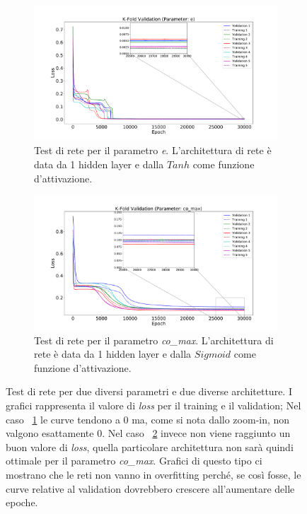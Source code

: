 \documentclass[12pt,a4paper,final]{book}
\begin{document}
\begin{figure}[!ht]
\centering
	\begin{subfigure}{\textwidth}
	    \centering
	    \includegraphics[width=0.77\linewidth]{../figures/validation_e_zoom.pdf}
	    \caption{Test di rete per il parametro \textit{e}. L'architettura di rete è data da 1 hidden layer e dalla $Tanh$ come funzione d'attivazione.}
	    \label{test1}
	\end{subfigure}
	\newline
	\begin{subfigure}{\textwidth}
		\centering
	    \includegraphics[width=0.77\linewidth]{../figures/validation_co_max_zoom.pdf}
		\caption{Test di rete per il parametro \textit{co\_max}. L'architettura di rete è data da 1 hidden layer e dalla $Sigmoid$ come funzione d'attivazione.}
		\label{test2}
	\end{subfigure}
	\caption{Test di rete per due diversi parametri e due diverse architetture. I grafici rappresenta il valore di \textit{loss} per il training e il validation; Nel caso ~\ref{test1} le curve tendono a 0 ma, come si nota dallo zoom-in, non valgono esattamente 0. Nel caso ~\ref{test2} invece non viene raggiunto un buon valore di \textit{loss}, quella particolare architettura non sarà quindi ottimale per il parametro \textit{co\_max}. Grafici di questo tipo ci mostrano che le reti non vanno in overfitting perché, se così fosse, le curve relative al validation dovrebbero crescere all'aumentare delle epoche.}
	\label{test_rete}
\end{figure}
\end{document}

